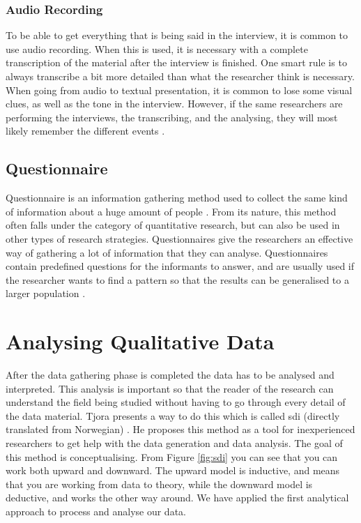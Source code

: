 \subsubsection{Audio Recording}
To be able to get everything that is being said in the interview, it is common to use audio recording. When this is used, it is necessary with a complete transcription of the material after the interview is finished. One smart rule is to always transcribe a bit more detailed than what the researcher think is necessary. When going from audio to textual presentation, it is common to lose some visual clues, as well as the tone in the interview. However, if the same researchers are performing the interviews, the transcribing, and the analysing, they will most likely remember the different events \cite{tjora}. 

\subsection{Questionnaire}
Questionnaire is an information gathering method used to collect  the same kind of information about a huge amount of people \cite{oates}. From its nature, this method often falls under the category of quantitative research, but can also be used in other types of research strategies. Questionnaires give the researchers an effective way of gathering a lot of information that they can analyse. Questionnaires contain predefined questions for the informants to answer, and are usually used if the researcher wants to find a pattern so that the results can be generalised to a larger population  \cite{oates}. 

\section{Analysing Qualitative Data}
\label{sec:analysingdata}
After the data gathering phase is completed the data has to be analysed and interpreted. This analysis is important so that the reader of the research can understand the field being studied without having to go through every detail of the data material. Tjora presents a way to do this which is called \ac{sdi} (directly translated from Norwegian) \cite{tjora}. He proposes this method as a tool for inexperienced researchers to get help with the data generation and data analysis. The goal of this method is conceptualising. From Figure \ref{fig:sdi} you can see that you can work both upward and downward. The upward model is inductive, and means that you are working from data to theory, while the downward model is deductive, and works the other way around. We have applied the first analytical approach to process and analyse our data.

